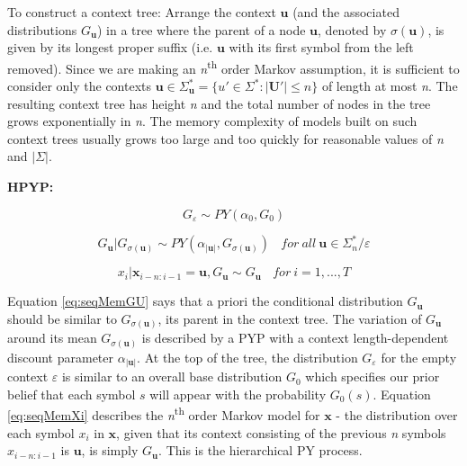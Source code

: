 To construct a context tree: Arrange the context $\boldsymbol{u}$ (and the associated distributions $G_{\boldsymbol{u}}$) in a tree where the parent of a node $\boldsymbol{u}$, denoted by $\sigma(\boldsymbol{u})$, is given by its longest proper suffix (i.e. $\boldsymbol{u}$ with its first symbol from the left removed). Since we are making an \textit{n}\textsuperscript{th} order Markov assumption, it is sufficient to consider only the contexts $\boldsymbol{u} \in \Sigma_{\boldsymbol{u}}^{*} = \{u' \in \Sigma^{*} :|\boldsymbol{U}'|\leq n\}$ of length at most \textit{n}. The resulting context tree has height \textit{n} and the total number of nodes in the tree grows exponentially in \textit{n}. The memory complexity of models built on such context trees usually grows too large and too quickly for reasonable values of \textit{n} and $|\Sigma|$.

\textbf{HPYP:}

\begin{equation}
G_{\varepsilon}\sim PY(\alpha_{0}, G_{0})
\label{eq:seqMemG}
\end{equation}

\begin{equation}
G_{\boldsymbol{u}}|G_{\sigma(\boldsymbol{u})}\sim PY(\alpha_{|\boldsymbol{u}|}, G_{\sigma(\boldsymbol{u})}) \ \ \ \  for\ all\ \boldsymbol{u} \in \Sigma_{n}^{*}/\varepsilon
\label{eq:seqMemGU}
\end{equation}

\begin{equation}
x_{i}|\boldsymbol{x}_{i-n:i-1}=\boldsymbol{u}, G_{\boldsymbol{u}}\sim G_{\boldsymbol{u}} \ \ \ \  for\ i=1, ..., T
\label{eq:seqMemXi}
\end{equation}

\noindent Equation \ref{eq:seqMemGU} says that a priori the conditional distribution $G_{\boldsymbol{u}}$ should be similar to $G_{\sigma(\boldsymbol{u})}$, its parent in the context tree. The variation of $G_{\boldsymbol{u}}$ around its mean $G_{\sigma(\boldsymbol{u})}$ is described by a PYP with a context length-dependent discount parameter $\alpha_{|\boldsymbol{u}|}$. At the top of the tree, the distribution $G_{\varepsilon}$ for the empty context $\varepsilon$ is similar to an overall base distribution $G_{0}$ which specifies our prior belief that each symbol $s$ will appear with the probability $G_{0}(s)$. Equation \ref{eq:seqMemXi} describes the \textit{n}\textsuperscript{th} order Markov model for $\boldsymbol{x}$ - the distribution over each symbol $x_{i}$ in $\boldsymbol{x}$, given that its context consisting of the previous \textit{n} symbols $x_{i-n:i-1}$ is $\boldsymbol{u}$, is simply $G_{\boldsymbol{u}}$. This is the hierarchical PY process.

